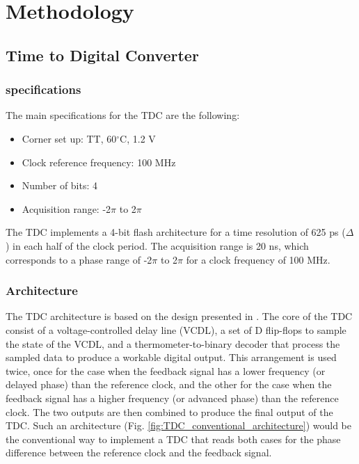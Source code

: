 \chapter{Methodology}
\section{Time to Digital Converter}

\subsection{specifications}
The main specifications for the TDC are the following:
\begin{itemize}
    \item Corner set up: TT, 60$^{\circ}$C, 1.2 V
    \item Clock reference frequency: 100 MHz
    \item Number of bits: 4
    \item Acquisition range: -2$\pi$ to 2$\pi$
\end{itemize}

The TDC implements a 4-bit flash architecture for a time resolution of 625 ps ($\Delta$) in each half of the clock period. The acquisition range is 20 ns, which corresponds to a phase 
range of -2$\pi$ to 2$\pi$ for a clock frequency of 100 MHz.

\subsection{Architecture}
The TDC architecture is based on the design presented in \cite{bib:tdc_flash}. The core of the TDC consist of a voltage-controlled delay line (VCDL), a set of D flip-flops to sample the
state of the VCDL, and a thermometer-to-binary decoder that process the sampled data to produce a workable digital output. This arrangement is used twice, once for the case when the
feedback signal has a lower frequency (or delayed phase) than the reference clock, and the other for the case when the feedback signal has a higher frequency (or advanced phase) than
the reference clock. The two outputs are then combined to produce the final output of the TDC. Such an architecture (Fig. \ref{fig:TDC_conventional_architecture}) would be the 
conventional way to implement a TDC that reads both cases for the phase difference between the reference clock and the feedback signal. 

